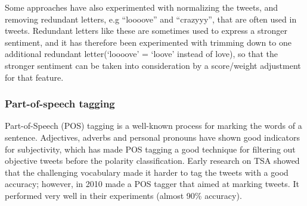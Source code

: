 Some approaches have also experimented with normalizing the tweets, and removing redundant letters, e.g “loooove” and “crazyyy”, that are often used in tweets. Redundant letters like these are sometimes used to express a stronger sentiment, and it has therefore been experimented with trimming down to one additional redundant letter(‘loooove’ = ‘loove’ instead of love), so that the stronger sentiment can be taken into consideration by a score/weight adjustment for that feature.

\subsubsection*{Part-of-speech tagging}
Part-of-Speech (POS) tagging is a well-known process for marking the words of a sentence. Adjectives, adverbs and personal pronouns have shown good indicators for subjectivity, which has made POS tagging a good technique for filtering out objective tweets before the polarity classification. Early research on TSA showed that the challenging vocabulary made it harder to tag the tweets with a good accuracy; however, in 2010 \cite{article:gimpel} made a POS tagger that aimed at marking tweets. It performed very well in their experiments (almost 90\% accuracy).

